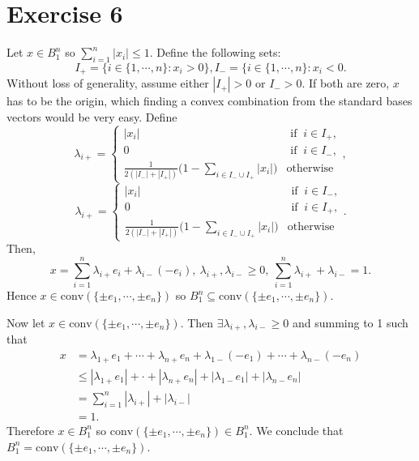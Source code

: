 \section*{Exercise 6}
Let $x \in B_1^n$ so $\sum_{i = 1}^{n} |x_i| \leq 1$. Define the following sets: 
\[ I_+ = \{ i \in \{1, \cdots, n\}: x_i > 0 \}, I_- = \{ i \in \{1, \cdots, n\}: x_i < 0. \]
Without loss of generality, assume either $|I_+| > 0$ or $I_- > 0$. If both are zero, $x$ has to be 
the origin, which finding a convex combination from the standard bases vectors would be very easy.
Define 
\[ \lambda_{i+} = \begin{cases}
	|x_i| &\text{ if } \ i \in I_+, \\
	0 &\text{ if } \ i \in I_-, \\
	\frac{1}{2(|I_-| + |I_+|)} \biggl( 1 - \sum_{i \in I_- \cup I_+}^{} |x_i| \biggr) &\text{otherwise}
\end{cases}, \]
\[ \lambda_{i+} = \begin{cases}
	|x_i| &\text{ if } \ i \in I_-, \\
	0 &\text{ if } \ i \in I_+, \\
	\frac{1}{2(|I_-| + |I_+|)} \biggl( 1 - \sum_{i \in I_- \cup I_+}^{} |x_i| \biggr) &\text{otherwise}
\end{cases}. \]
Then, 
\[ x = \sum_{i = 1}^{n} \lambda_{i+}e_i + \lambda_{i-} (-e_i), \ \lambda_{i+}, \lambda_{i-} \geq 0, \ \sum_{i = 1}^{n} 
\lambda_{i+} + \lambda_{i-} = 1. \]
Hence $x \in \text{conv}(\{\pm e_1, \cdots, \pm e_n\})$ so $B_1^n \subseteq \text{conv}(\{\pm e_1, \cdots, \pm e_n\})$.

Now let $x \in \text{conv}(\{\pm e_1, \cdots, \pm e_n\})$. Then $\exists \lambda_{i+}, \lambda_{i-} \geq 0$ and summing 
to 1 such that 
\begin{align*}
	x 
	&= \lambda_{1+} e_1 + \cdots + \lambda_{n+} e_n + \lambda_{1-} (-e_1) + \cdots + \lambda_{n-} (-e_n) \\
	&\leq |\lambda_{1+} e_1| + \cdot + |\lambda_{n+} e_n| + |\lambda_{1-} e_1| + |\lambda_{n-} e_n| \\
	&= \sum_{i = 1}^{n} |\lambda_{i+}| + |\lambda_{i-}| \\
	&= 1.
\end{align*}
Therefore $x \in B_1^n$ so $\text{conv}(\{\pm e_1, \cdots, \pm e_n\}) \in B_1^n$. We conclude that 
$B_1^n = \text{conv}(\{\pm e_1, \cdots, \pm e_n\})$. 


\newpage
